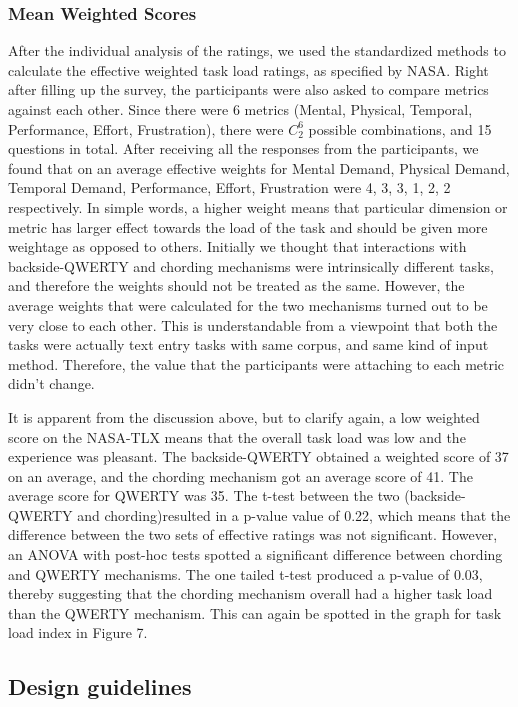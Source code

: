 \subsubsection{Mean Weighted Scores}
After the individual analysis of the ratings, we used the standardized
methods to calculate the effective weighted task load ratings, as
specified by NASA. Right after filling up the survey, the participants
were also asked to compare metrics against each other. Since there
were 6 metrics (Mental, Physical, Temporal, Performance, Effort,
Frustration), there were $C_{2}^{6}$ possible combinations, and 15
questions in total. After receiving all the responses from the
participants, we found that on an average effective weights for Mental
Demand, Physical Demand, Temporal Demand, Performance, Effort,
Frustration were 4, 3, 3, 1, 2, 2 respectively. In simple words, a
higher weight means that particular dimension or metric has larger
effect towards the load of the task and should be given more weightage
as opposed to others. Initially we thought that interactions with
backside-QWERTY and chording mechanisms were intrinsically different
tasks, and therefore the weights should not be treated as the
same. However, the average weights that were calculated for the two
mechanisms turned out to be very close to each other. This is
understandable from a viewpoint that both the tasks were actually text
entry tasks with same corpus, and same kind of input
method. Therefore, the value that the participants were attaching to
each metric didn't change.

It is apparent from the discussion above, but to clarify again, a low
weighted score on the NASA-TLX means that the overall task load was
low and the experience was pleasant. The backside-QWERTY obtained a
weighted score of 37 on an average, and the chording mechanism got an
average score of 41. The average score for QWERTY was 35. The t-test between the two (backside-QWERTY and chording)resulted in a p-value
value of 0.22, which means that the difference between the two sets of
effective ratings was not significant. However, an ANOVA with post-hoc tests spotted a significant difference between chording and QWERTY mechanisms. The one tailed t-test produced a p-value of 0.03, thereby suggesting that the chording mechanism overall had a higher task load than the QWERTY mechanism. This can again be spotted in the graph for task load index in Figure 7.

\subsection{Design guidelines}


